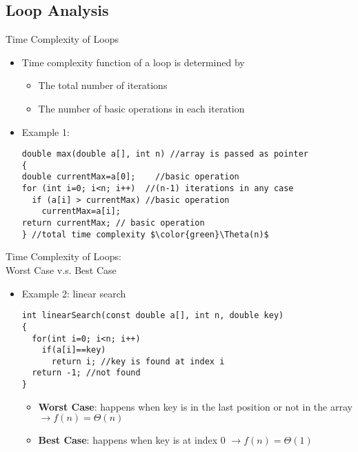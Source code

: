 

\subsection{Loop Analysis}
\item Time Complexity of Loops
  \begin{itemize}
  \item Time complexity function of a loop is determined by
    \begin{itemize}
    \item The total number of iterations
    \item The number of basic operations in each iteration
    \end{itemize}
  \item Example 1:
\begin{lstlisting}[mathescape=true]
double max(double a[], int n) //array is passed as pointer
{
double currentMax=a[0];    //basic operation
for (int i=0; i<n; i++)  //(n-1) iterations in any case
  if (a[i] > currentMax) //basic operation
    currentMax=a[i];
return currentMax; // basic operation
} //total time complexity $\color{green}\Theta(n)$
\end{lstlisting}
  \end{itemize}
\item Time Complexity of Loops: \\
      Worst Case v.s. Best Case
  \begin{itemize}
  \item Example 2: linear search 
\begin{lstlisting}
int linearSearch(const double a[], int n, double key)
{
  for(int i=0; i<n; i++)
    if(a[i]==key)
      return i; //key is found at index i
  return -1; //not found
}
\end{lstlisting}
    \begin{itemize} 
    \item \textbf{Worst Case}: happens when key is in the last position or not in the array $\rightarrow f(n)=\Theta(n)$
    \item \textbf{Best Case}: happens when key is at index 0 $\rightarrow f(n)=\Theta(1)$
    \end{itemize}
  \end{itemize}
